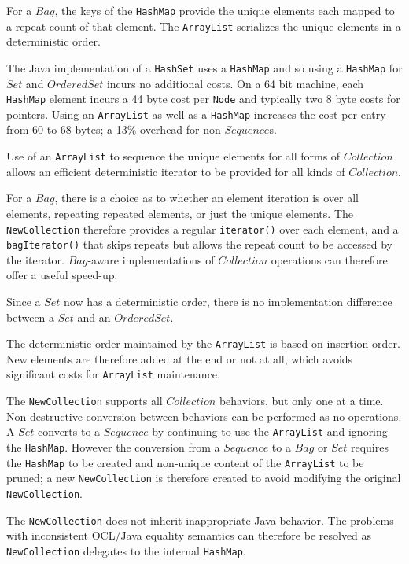 \documentclass{llncs}
\begin{document}
For a $Bag$, the keys of the \verb$HashMap$ provide the unique elements each mapped to a repeat count of that element. The \verb$ArrayList$ serializes the unique elements in a deterministic order.

The Java implementation of a \verb$HashSet$ uses a \verb$HashMap$ and so using a \verb$HashMap$ for $Set$ and $OrderedSet$ incurs no additional costs. On a 64 bit machine, each \verb$HashMap$ element incurs a 44 byte cost per \verb$Node$ and typically two 8 byte costs for pointers. Using an \verb$ArrayList$ as well as a \verb$HashMap$ increases the cost per entry from 60 to 68 bytes; a 13\% overhead for non-$Sequence$s.

Use of an \verb$ArrayList$ to sequence the unique elements for all forms of $Collection$ allows an efficient deterministic iterator to be provided for all kinds of $Collection$.

For a $Bag$, there is a choice as to whether an element iteration is over all elements, repeating repeated elements, or just the unique elements. The \verb$NewCollection$ therefore provides a regular \verb$iterator()$ over each element, and a \verb$bagIterator()$ that skips repeats but allows the repeat count to be accessed by the iterator. $Bag$-aware implementations of $Collection$ operations can therefore offer a useful speed-up.

Since a $Set$ now has a deterministic order, there is no implementation difference between a $Set$ and an $OrderedSet$.

The deterministic order maintained by the \verb$ArrayList$ is based on insertion order. New elements are therefore added at the end or not at all, which avoids significant costs for \verb$ArrayList$ maintenance.

The \verb$NewCollection$ supports all $Collection$ behaviors, but only one at a time. Non-destructive conversion between behaviors can be performed as no-operations. A $Set$ converts to a $Sequence$ by continuing to use the \verb$ArrayList$ and ignoring the \verb$HashMap$. However the conversion from a $Sequence$ to a $Bag$ or $Set$ requires the \verb$HashMap$ to be created and non-unique content of the \verb$ArrayList$ to be pruned; a new \verb$NewCollection$ is therefore created to avoid modifying the original \verb$NewCollection$.

The \verb$NewCollection$ does not inherit inappropriate Java behavior. The problems with inconsistent OCL/Java equality semantics can therefore be resolved as \verb$NewCollection$ delegates to the internal \verb$HashMap$.
\end{document}
